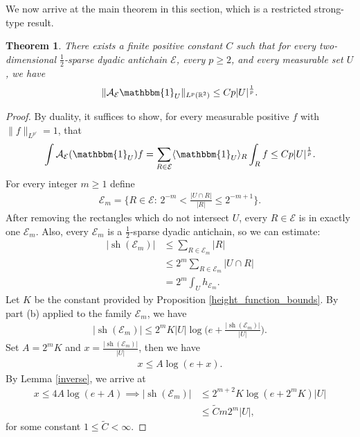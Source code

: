 \documentclass[oneside]{amsart}
\newtheorem{theorem}{Theorem}
\theoremstyle{definition}
\theoremstyle{plain}
\numberwithin{equation}{section}
\numberwithin{theorem}{section}
\newcommand{\sh}{\operatorname{sh}}
\newcommand{\ind}{\mathbbm{1}}
\begin{document}
We now arrive at the main theorem in this section, which is a
restricted strong-type result.
\begin{theorem} \label{restricted_strong}
  There exists a finite positive constant $C$ such that
  for every two-dimensional $\frac{1}{2}$-sparse dyadic antichain $\mathcal{E}$,
  every $p \geq2$,
  and every measurable set $U$,
  we have
  \begin{align*}
    \|\mathcal{A}_{\mathcal{E}} \ind_U\|_{L^p(\mathbb{R}^2)}
    \leq C p|U|^{\frac{1}{p}}.
  \end{align*}
\end{theorem}
\begin{proof}
  By duality, it suffices to show, for every measurable positive $f$ with
  $\|f\|_{L^{p'}} = 1$, that
  \begin{align*}
    \int \mathcal{A}_{\mathcal{E}}(\ind_U) f
    = \sum_{R \in \mathcal{E}} \langle \ind_U \rangle_R \int_R f
    \leq C p|U|^{\frac{1}{p}}.
  \end{align*}
  For every integer $m \geq 1$ define
  \begin{align*}
    \mathcal{E}_m = \bigg\{R \in \mathcal{E}:\,
    2^{-m} < \frac{|U \cap R|}{|R|} \leq 2^{-m+1} \bigg\}.
  \end{align*}
  After removing the rectangles which do not intersect $U$, every
  $R \in \mathcal{E}$ is in exactly one $\mathcal{E}_m$.
  Also, every $\mathcal{E}_m$ is a $\frac{1}{2}$-sparse dyadic antichain, so we
  can estimate:
  \begin{align*}
    |\sh(\mathcal{E}_m)| &\leq \sum_{R \in \mathcal{E}_m} |R| \\
    &\leq 2^m \sum_{R \in \mathcal{E}_m} |U \cap R| \\
    &= 2^m \int_U h_{\mathcal{E}_m}.
  \end{align*}
  Let $K$ be the constant provided by Proposition \ref{height_function_bounds}.
  By part (b) applied to the family $\mathcal{E}_m$, we have
  \begin{align*}
    |\sh(\mathcal{E}_m)| \leq 2^m  K |U|\log\bigg( e +
    \frac{|\sh(\mathcal{E}_m)|}{|U|} \bigg).
  \end{align*}
  Set $A = 2^m K$ and $x = \frac{|\sh(\mathcal{E}_m)|}{|U|}$, then we have
  \begin{align*}
    x \leq A\log(e+x).
  \end{align*}
  By Lemma \ref{inverse}, we arrive at
  \begin{align*}
    x \leq 4A \log(e+A) \implies |\sh(\mathcal{E}_m)|
    &\leq 2^{m+2}K \log(e + 2^m K)|U| \\
    &\leq \widetilde{C} m 2^m |U|,
  \end{align*}
  for some constant $1 \leq \widetilde{C} < \infty$.


\end{proof}
\end{document}
